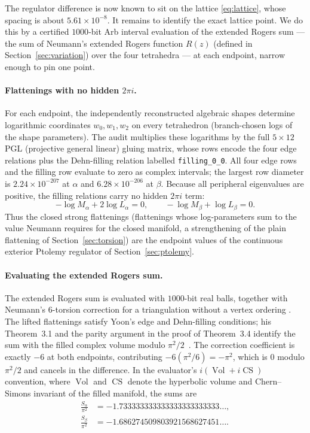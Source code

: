\documentclass[11pt]{article}
\theoremstyle{definition}
\newcommand{\CS}{\operatorname{CS}}
\newcommand{\Vol}{\operatorname{Vol}}
\begin{document}
The regulator difference is now known to sit on the lattice \eqref{eq:lattice},
whose spacing is about $5.61\times10^{-8}$.  It remains to identify the exact
lattice point.  We do this by a certified $1000$-bit Arb interval evaluation of the
extended Rogers sum --- the sum of Neumann's extended Rogers function $R(z)$
(defined in Section~\ref{sec:variation}) over the four tetrahedra --- at each
endpoint, narrow enough to pin one point.

\paragraph{Flattenings with no hidden $2\pi i$.}
For each endpoint, the independently reconstructed algebraic shapes determine
logarithmic coordinates $w_0,w_1,w_2$ on every tetrahedron (branch-chosen logs
of the shape parameters).  The audit multiplies these logarithms by the full
$5\times12$ PGL (projective general linear) gluing matrix, whose rows encode the
four edge relations plus the
Dehn-filling relation labelled \texttt{filling\_0\_0}.  All four edge rows and the
filling row evaluate to zero as complex intervals; the largest row diameter is
$2.24\times10^{-207}$ at $\alpha$ and $6.28\times10^{-206}$ at $\beta$.  Because
all peripheral eigenvalues are positive, the filling relations carry no hidden
$2\pi i$ term:
\[
 -\log M_\alpha+2\log L_\alpha=0,
 \qquad
 -\log M_\beta+\log L_\beta=0.
\]
Thus the closed strong flattenings (flattenings whose log-parameters sum to the
value Neumann requires for the closed manifold, a strengthening of the plain
flattening of Section~\ref{sec:torsion}) are the endpoint values of the
continuous exterior Ptolemy regulator of Section~\ref{sec:ptolemy}.

\paragraph{Evaluating the extended Rogers sum.}
The extended Rogers sum is evaluated with $1000$-bit real balls, together
with Neumann's $6$-torsion correction for a triangulation without a vertex
ordering \cite[Section~13 and Proposition~13.1]{Neumann}.  The lifted flattenings
satisfy Yoon's edge and Dehn-filling conditions; his Theorem~3.1 and the parity
argument in the proof of Theorem~3.4 identify the sum with the filled complex
volume modulo $\pi^2/2$~\cite{Yoon}.  The correction coefficient is exactly $-6$
at both endpoints, contributing $-6(\pi^2/6)=-\pi^2$, which is $0$ modulo
$\pi^2/2$ and cancels in the difference.  In the evaluator's $i(\Vol+i\CS)$
convention, where $\Vol$ and $\CS$ denote the hyperbolic volume and
Chern--Simons invariant of the filled manifold, the sums are
\begin{align}
 \frac{S_\alpha}{\pi^2}
  &=-1.733333333333333333333333\ldots,
  \label{eq:Sa}\\
 \frac{S_\beta}{\pi^2}
  &=-1.686274509803921568627451\ldots.
  \label{eq:Sb}
\end{align}
\end{document}
